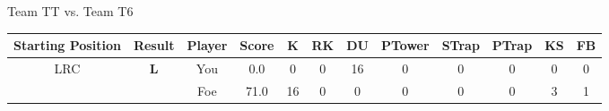 \documentclass[a4paper,12pt]{article}
\begin{document}
\begin{tabular}[t]{| c | c | c | c | c | c | c | c | c | c | c | c
      |}
                      
      
                      
      
                      
      
                      
      
                      
      
                      
      
                      
                        \hline
                      \end{tabular}
                      
  \vspace*{2em}
  \par {\large {\color{Gray} Team} TT {\color{Gray}
      vs. Team} T6}
  \newline
  \begin{tabular}[t]{| c | c | c | c | c | c | c | c | c | c | c | c
      |}
    \hline
    Starting Position & \textbf{Result} & Player & \textbf{Score} & K & RK & DU & PTower & STrap & PTrap & KS & FB \\
    
      
        \hline
        \multirow{2}{*}{  LRC
             } &
              \multirow{2}{*}{  \textbf{L}  } & 
                    \cellcolor{yellow!25} You & \cellcolor{yellow!25} 0.0 & \cellcolor{yellow!25} 0 &
                    \cellcolor{yellow!25} 0 & \cellcolor{yellow!25} 16 & \cellcolor{yellow!25} 0 &
                    \cellcolor{yellow!25} 0 & \cellcolor{yellow!25} 0 & \cellcolor{yellow!25} 0 &
                    \cellcolor{yellow!25} 0 \\
                    \cline{3-12}
                    & & \cellcolor{red!15} Foe & \cellcolor{red!15} 71.0 & \cellcolor{red!15} 16 & \cellcolor{red!15}
                    0 & \cellcolor{red!15} 0
                    & \cellcolor{red!15} 0 & \cellcolor{red!15}
                    0 & \cellcolor{red!15} 0 
                    & \cellcolor{red!15} 3 & \cellcolor{red!15}
                    1 \\
                    
                      
      
                      
      
                      
      
                      
      
                      
      

\end{tabular}
\end{document}
